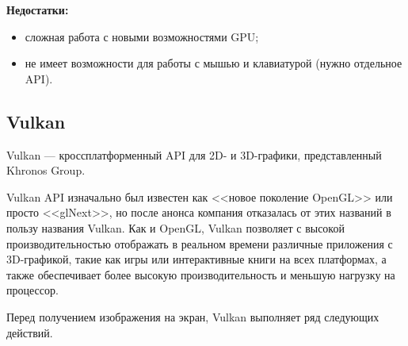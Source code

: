 \textbf{Недостатки:} 
\begin{itemize}
    \item сложная работа с новыми возможностями GPU;
    \item не имеет возможности для работы с мышью и клавиатурой (нужно отдельное API).
\end{itemize}


\subsection{Vulkan}

Vulkan — кроссплатформенный API для 2D- и 3D-графики, представленный Khronos Group.

Vulkan API изначально был известен как <<новое поколение OpenGL>> или просто <<glNext>>, но после анонса компания отказалась от этих названий в пользу названия Vulkan. Как и OpenGL, Vulkan позволяет с высокой производительностью отображать в реальном времени различные приложения с 3D-графикой, такие как игры или интерактивные книги на всех платформах, а также обеспечивает более высокую производительность и меньшую нагрузку на процессор.

Перед получением изображения на экран, Vulkan выполняет ряд следующих действий.

